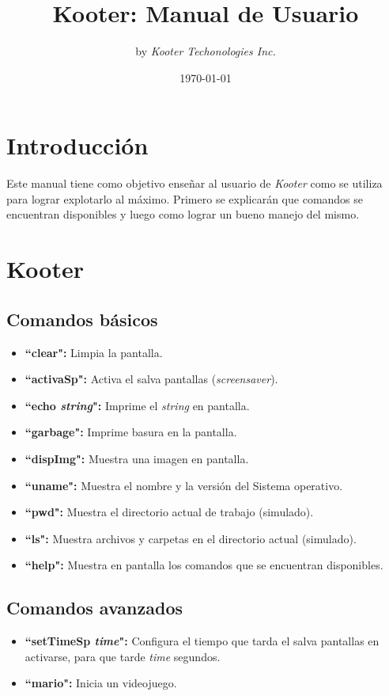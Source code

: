 \documentclass[a4paper,11pt]{article}
\title{\textbf{Kooter: Manual de Usuario}}
\author{by \textit{Kooter Techonologies Inc.}}
\date{\today}
\begin{document}
\maketitle
\newpage
\tableofcontents
\newpage
\section{Introducción}
Este manual tiene como objetivo enseñar al usuario de \emph{Kooter} como se utiliza para lograr explotarlo al máximo. Primero se explicarán que comandos se encuentran disponibles y luego como lograr un bueno manejo del mismo.

\section{Kooter}
\subsection{Comandos básicos}
\begin{itemize}
	\item \textbf{``clear":} Limpia la pantalla.
	\item \textbf{``activaSp":} Activa el salva pantallas (\emph{screensaver}).
	\item \textbf{``echo \emph{string}":} Imprime el \emph{string} en pantalla.
	\item \textbf{``garbage":} Imprime basura en la pantalla.
	\item \textbf{``dispImg":} Muestra una imagen en pantalla.
	\item \textbf{``uname":} Muestra el nombre y la versión del Sistema operativo.
	\item \textbf{``pwd":} Muestra el directorio actual de trabajo (simulado).
	\item \textbf{``ls":} Muestra archivos y carpetas en el directorio actual (simulado).
	\item \textbf{``help":} Muestra en pantalla los comandos que se encuentran disponibles.
	
	
\end{itemize}
\subsection{Comandos avanzados}
\begin{itemize}
	\item \textbf{``setTimeSp \emph{time}":} Configura el tiempo que tarda el salva pantallas en activarse, para que tarde \emph{time} segundos. 
	\item \textbf{``mario":} Inicia un videojuego.
\end{itemize}
\end{document}
